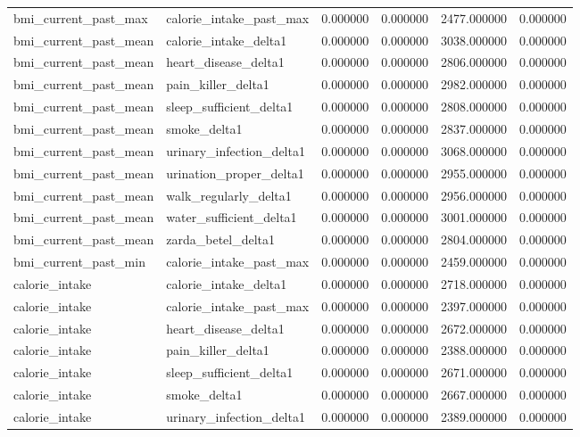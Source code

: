 \begin{longtable}{llrrrr}
bmi\_current\_past\_max & calorie\_intake\_past\_max & 0.000000 & 0.000000 & 2477.000000 & 0.000000 \\
bmi\_current\_past\_mean & calorie\_intake\_delta1 & 0.000000 & 0.000000 & 3038.000000 & 0.000000 \\
bmi\_current\_past\_mean & heart\_disease\_delta1 & 0.000000 & 0.000000 & 2806.000000 & 0.000000 \\
bmi\_current\_past\_mean & pain\_killer\_delta1 & 0.000000 & 0.000000 & 2982.000000 & 0.000000 \\
bmi\_current\_past\_mean & sleep\_sufficient\_delta1 & 0.000000 & 0.000000 & 2808.000000 & 0.000000 \\
bmi\_current\_past\_mean & smoke\_delta1 & 0.000000 & 0.000000 & 2837.000000 & 0.000000 \\
bmi\_current\_past\_mean & urinary\_infection\_delta1 & 0.000000 & 0.000000 & 3068.000000 & 0.000000 \\
bmi\_current\_past\_mean & urination\_proper\_delta1 & 0.000000 & 0.000000 & 2955.000000 & 0.000000 \\
bmi\_current\_past\_mean & walk\_regularly\_delta1 & 0.000000 & 0.000000 & 2956.000000 & 0.000000 \\
bmi\_current\_past\_mean & water\_sufficient\_delta1 & 0.000000 & 0.000000 & 3001.000000 & 0.000000 \\
bmi\_current\_past\_mean & zarda\_betel\_delta1 & 0.000000 & 0.000000 & 2804.000000 & 0.000000 \\
bmi\_current\_past\_min & calorie\_intake\_past\_max & 0.000000 & 0.000000 & 2459.000000 & 0.000000 \\
calorie\_intake & calorie\_intake\_delta1 & 0.000000 & 0.000000 & 2718.000000 & 0.000000 \\
calorie\_intake & calorie\_intake\_past\_max & 0.000000 & 0.000000 & 2397.000000 & 0.000000 \\
calorie\_intake & heart\_disease\_delta1 & 0.000000 & 0.000000 & 2672.000000 & 0.000000 \\
calorie\_intake & pain\_killer\_delta1 & 0.000000 & 0.000000 & 2388.000000 & 0.000000 \\
calorie\_intake & sleep\_sufficient\_delta1 & 0.000000 & 0.000000 & 2671.000000 & 0.000000 \\
calorie\_intake & smoke\_delta1 & 0.000000 & 0.000000 & 2667.000000 & 0.000000 \\
calorie\_intake & urinary\_infection\_delta1 & 0.000000 & 0.000000 & 2389.000000 & 0.000000 \\

\end{longtable}
